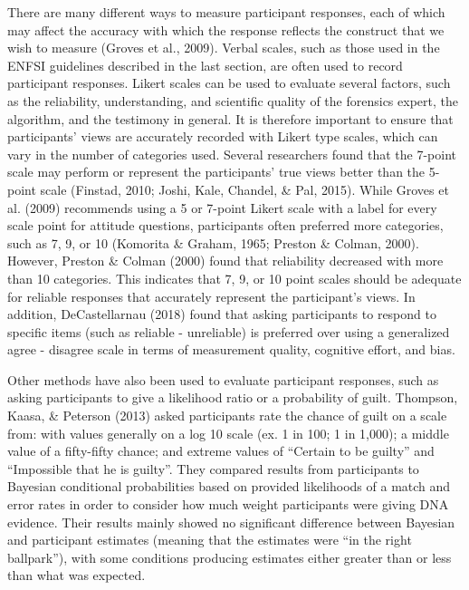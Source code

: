 \documentclass[print]{nuthesis}
\begin{document}
There are many different ways to measure participant responses, each of which may affect the accuracy with which the response reflects the construct that we wish to measure (Groves et al., 2009).
Verbal scales, such as those used in the ENFSI guidelines described in the last section, are often used to record participant responses.
Likert scales can be used to evaluate several factors, such as the reliability, understanding, and scientific quality of the forensics expert, the algorithm, and the testimony in general.
It is therefore important to ensure that participants' views are accurately recorded with Likert type scales, which can vary in the number of categories used.
Several researchers found that the 7-point scale may perform or represent the participants' true views better than the 5-point scale (Finstad, 2010; Joshi, Kale, Chandel, \& Pal, 2015).
While Groves et al. (2009) recommends using a 5 or 7-point Likert scale with a label for every scale point for attitude questions, participants often preferred more categories, such as 7, 9, or 10 (Komorita \& Graham, 1965; Preston \& Colman, 2000).
However, Preston \& Colman (2000) found that reliability decreased with more than 10 categories.
This indicates that 7, 9, or 10 point scales should be adequate for reliable responses that accurately represent the participant's views.
In addition, DeCastellarnau (2018) found that asking participants to respond to specific items (such as reliable - unreliable) is preferred over using a generalized agree - disagree scale in terms of measurement quality, cognitive effort, and bias.

Other methods have also been used to evaluate participant responses, such as asking participants to give a likelihood ratio or a probability of guilt.
Thompson, Kaasa, \& Peterson (2013) asked participants rate the chance of guilt on a scale from: with values generally on a log 10 scale (ex. 1 in 100; 1 in 1,000); a middle value of a fifty-fifty chance; and extreme values of ``Certain to be guilty'' and ``Impossible that he is guilty''.
They compared results from participants to Bayesian conditional probabilities based on provided likelihoods of a match and error rates in order to consider how much weight participants were giving DNA evidence.
Their results mainly showed no significant difference between Bayesian and participant estimates (meaning that the estimates were ``in the right ballpark''), with some conditions producing estimates either greater than or less than what was expected.
\end{document}

